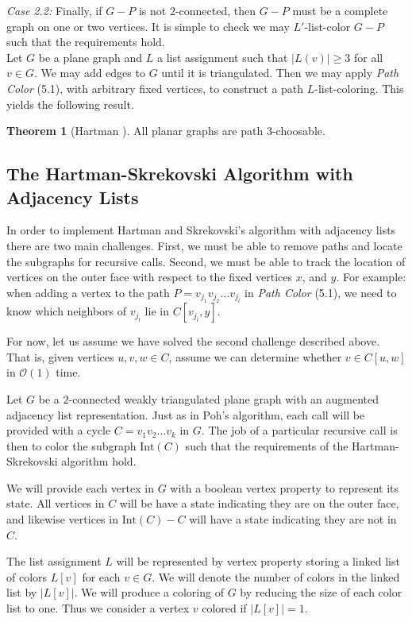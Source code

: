 \documentclass[letterpaper, 12pt]{article}
\theoremstyle{definition}
\theoremstyle{definition}
\theoremstyle{thm}
\newtheorem{theorem}{Theorem}[section]
\theoremstyle{definition}
\begin{document}
\textit{Case 2.2:} Finally, if $G-P$ is not $2$-connected, then $G-P$ must be a
complete graph on one or two vertices. It is simple to check we may
$L'$-list-color $G-P$ such that the requirements hold.\\

Let $G$ be a plane graph and $L$ a list assignment such that $|L(v)|\ge 3$
for all $v\in G$. We may add edges to $G$ until it is triangulated. Then
we may apply \textit{Path Color} (5.1), with arbitrary fixed vertices, to
construct a path $L$-list-coloring. This yields the following result.

\begin{theorem}[Hartman \cite{hartman}]
All planar graphs are path $3$-choosable.
\end{theorem}

\subsection{The Hartman-Skrekovski Algorithm with Adjacency Lists}

In order to implement Hartman and Skrekovski's algorithm with adjacency lists
there are two main challenges. First, we must be able to remove paths and
locate the subgraphs for recursive calls. Second, we must be able to track the
location of vertices on the outer face with respect to the fixed vertices
$x$, and $y$. For example: when adding a vertex to the path
$P=v_{j_1}v_{j_2}\ldots v_{j_l}$ in \textit{Path Color} (5.1), we need to know
which neighbors of $v_{j_l}$ lie in $C[v_{j_l},y]$.

For now, let us assume we have solved the second challenge described above. That
is, given vertices $u,v,w\in C$, assume we can determine whether $v\in C[u,w]$
in $\mathcal{O}(1)$ time.

Let $G$ be a $2$-connected weakly triangulated plane graph with an augmented
adjacency list representation. Just as in Poh's algorithm, each call will be
provided with a cycle $C=v_1v_2\ldots v_k$ in $G$. The
job of a particular recursive call is then to color the subgraph $\text{Int}(C)$
such that the requirements of the Hartman-Skrekovski algorithm hold.

We will provide each vertex in $G$ with a boolean vertex property to represent
its state. All vertices in $C$ will be have a state indicating they are on the
outer face, and likewise vertices in $\text{Int}(C)-C$ will have a state
indicating they are not in $C$.

The list assignment $L$ will be represented by vertex property storing a linked
list of colors $L[v]$ for each $v\in G$. We will denote the number of colors
in the linked list by $|L[v]|$. We will produce a coloring of $G$ by reducing
the size of each color list to one. Thus we consider a vertex $v$
colored if $|L[v]|=1$.
\end{document}
